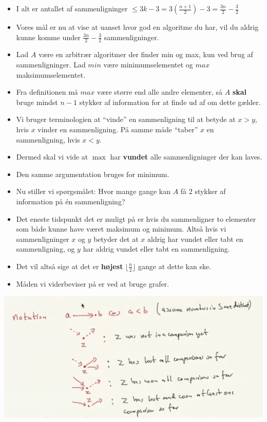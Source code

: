 \begin{frame}[allowframebreaks]
\begin{itemize}
  \item I alt er antallet af sammenligninger $\le 3k-3 = 3(\frac{n+1}{2})-3 = \frac{3n}{2} - \frac{3}{2}$
  \item Vores mål er nu at vise at uanset hvor god en algoritme du har, vil du aldrig kunne komme under $\frac{3n}{2} - \frac{3}{2}$ sammenligninger.
  \item Lad $A$ være en arbitrær algoritmer der finder min og max, kun ved brug af sammenligninger. Lad $min$ være minimumselementet og $max$ maksimumselementet.
  \item Fra definitionen må $max$ være større end alle andre elementer, så $A$ \textbf{skal} bruge mindst $n-1$ stykker af information for at finde ud af om dette gælder.
  \item Vi bruger terminologien at ``vinde'' en sammenligning til at betyde at $x > y$, hvis $x$ vinder en sammenligning. På samme måde ``taber'' $x$ en sammenligning, hvis $x < y$.
  \item Dermed skal vi vide at $\max$ har \textbf{vundet} alle sammenligninger der kan laves.
  \item Den samme argumentation bruges for minimum.
  \item Nu stiller vi spørgsmålet: Hvor mange gange kan $A$ få 2 stykker af information på én sammenligning?
  \item Det eneste tidspunkt det er muligt på er hvis du sammenligner to elementer som både kunne have været maksimum og minimum. Altså hvis vi sammenligninger $x$ og $y$ betyder det at $x$ aldrig har vundet eller tabt en sammenligning, og $y$ har aldrig vundet eller tabt en sammenligning.
  \item Det vil altså sige at det er \textbf{højest} $\lfloor \frac{n}{2} \rfloor$ gange at dette kan ske.
  \item Måden vi viderbeviser på er ved at bruge grafer.
 \end{itemize}
 \begin{center}
 \includegraphics[scale=0.3]{figur/vid22a.png}

\end{center}
\end{frame}
